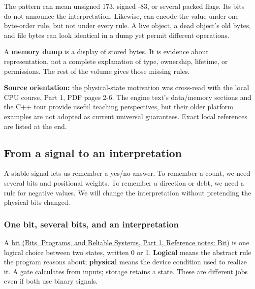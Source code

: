 The pattern  can mean unsigned 173, signed -83, or several packed flags. Its bits do not announce the interpretation. Likewise,  can encode the value  under one byte-order rule, but not under every rule. A live object, a dead object's old bytes, and file bytes can look identical in a dump yet permit different operations.

A \textbf{memory dump} is a display of stored bytes. It is evidence about representation, not a complete explanation of type, ownership, lifetime, or permissions. The rest of the volume gives those missing rules.

\textbf{Source orientation:} the physical-state motivation was cross-read with the local CPU course, Part 1, PDF pages 2-6. The engine text's data/memory sections and the C++ tour provide useful teaching perspectives, but their older platform examples are not adopted as current universal guarantees. Exact local references are listed at the end.

\subsection{From a signal to an interpretation}\label{05-engine-i-ch001-from-a-signal-to-an-interpretation}

\hypertarget{05-engine-i-ch001-from-a-signal-to-an-interpretation}{}

A stable signal lets us remember a yes/no answer. To remember a count, we need several bits and positional weights. To remember a direction or debt, we need a rule for negative values. We will change the interpretation without pretending the physical bits changed.

\subsubsection{One bit, several bits, and an interpretation}\label{05-engine-i-ch001-one-bit-several-bits-and-an-interpretation}

\hypertarget{05-engine-i-ch001-one-bit-several-bits-and-an-interpretation}{}

A \href{../01-Bits-Programs-and-Reliable-Systems-P01/main.pdf\#nameddest=appendix-ddbb69998a2e}{bit (Bits, Programs, and Reliable Systems, Part 1, Reference notes: Bit)} is one logical choice between two states, written 0 or 1. \textbf{Logical} means the abstract rule the program reasons about; \textbf{physical} means the device condition used to realize it. A gate calculates from inputs; storage retains a state. These are different jobs even if both use binary signals.

